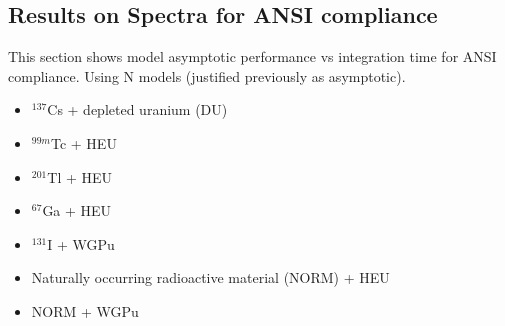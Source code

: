 





\subsection{Results on Spectra for ANSI compliance}

This section shows model asymptotic performance vs integration time for ANSI compliance. Using N models (justified previously as asymptotic). 


\begin{itemize}
  \item $^{137}$Cs + depleted uranium (DU)
  \item $^{99m}$Tc + HEU
  \item $^{201}$Tl + HEU
  \item $^{67}$Ga + HEU
  \item $^{131}$I + WGPu
  \item Naturally occurring radioactive material (NORM) + HEU
  \item NORM + WGPu
\end{itemize}


